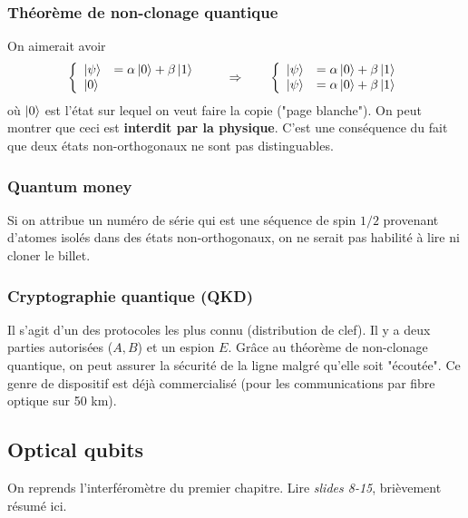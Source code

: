 \subsubsection{Théorème de non-clonage quantique}
On aimerait avoir
\begin{equation}
\left\{\begin{array}{ll}
\ket\psi &= \alpha\ket0+\beta\ket1\\
\ket0
\end{array}\right.\qquad\Rightarrow\qquad\left\{\begin{array}{ll}
\ket\psi &= \alpha\ket0+\beta\ket1\\
\ket\psi &= \alpha\ket0+\beta\ket1\\
\end{array}\right.
\end{equation}
où $\ket0$ est l'état sur lequel on veut faire la copie ("page blanche"). On peut montrer que
ceci est \textbf{interdit par la physique}. C'est une conséquence du fait que deux états 
non-orthogonaux ne sont pas distinguables.


\subsubsection{Quantum money}
Si on attribue un numéro de série qui est une séquence de spin $1/2$ provenant d'atomes 
isolés dans des états non-orthogonaux, on ne serait pas habilité à lire ni cloner le billet.

\subsubsection{Cryptographie quantique (QKD)}
Il s'agit d'un des protocoles les plus connu (distribution de clef). Il y a deux parties 
autorisées ($A,B$) et un espion $E$. Grâce au théorème de non-clonage quantique, on peut
assurer la sécurité de la ligne malgré qu'elle soit "écoutée". Ce genre de dispositif est
déjà commercialisé (pour les communications par fibre optique sur 50 km).

\subsection{Optical qubits}
On reprends l'interféromètre du premier chapitre. Lire \textit{slides 8-15}, brièvement 
résumé ici.

